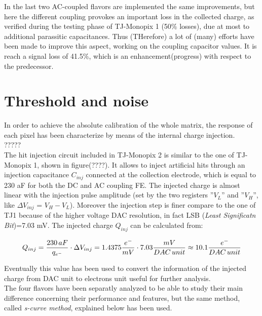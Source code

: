 In the last two AC-coupled flavors are implemented the same improvements, but here the different coupling provokes an important loss in the collected charge, as verified during the testing phase of TJ-Monopix 1 (50\% losses), due at most to additional parassitic capacitances. Thus (THerefore) a lot of (many) efforts have been made to improve this aspect, working on the coupling capacitor values. It is reach a signal loss of 41.5\%, which is an enhancement(progress) with respect to the predecessor.





\section{Threshold and noise}

In order to achieve the absolute calibration of the whole matrix, the response of each pixel has been characterize by means of the internal charge injection. \\
?????\\
The hit injection circuit included in TJ-Monopix 2 is similar to the one of TJ-Monopix 1, shown in figure(????). It allows to inject artificial hits through an injection capacitance \textbf{$C_{inj}$} connected at the collection electrode, which is equal to 230 aF for both the DC and AC coupling FE. The injected charge is almost linear with the injection pulse amplitude (set by the two registers ''\textbf{$V_{L}$}'' and ''\textbf{$V_{H}$}'', like $\Delta V_{inj}$ = \textbf{$V_{H}-V_{L}$}). Moreover the injection step is finer compare to the one of TJ1 because of the higher voltage DAC resolution, in fact LSB (\textit{Least Significatn Bit})=7.03 mV. The injected charge $Q_{inj}$ can be calculated from:

\begin{equation}
\small
Q_{inj} = \frac{230 \, aF}{q_{{e}^{-}}} \cdot \Delta V_{inj} = 1.4375 \frac{e^{-}}{mV} \cdot 7.03 \frac{mV}{DAC \, unit} \approx 10.1 \frac{e^{-}}{DAC \, unit}  
\label{conversion_factor}
\end{equation}

Eventually this value has been used to convert the information of the injected charge from DAC unit to electrons unit useful for further analysis.
\\
The four flavors have been separatly analyzed to be able to study their main difference concerning their performance and features, but the same method, called \textit{s-curve method}, explained below has been used. 


